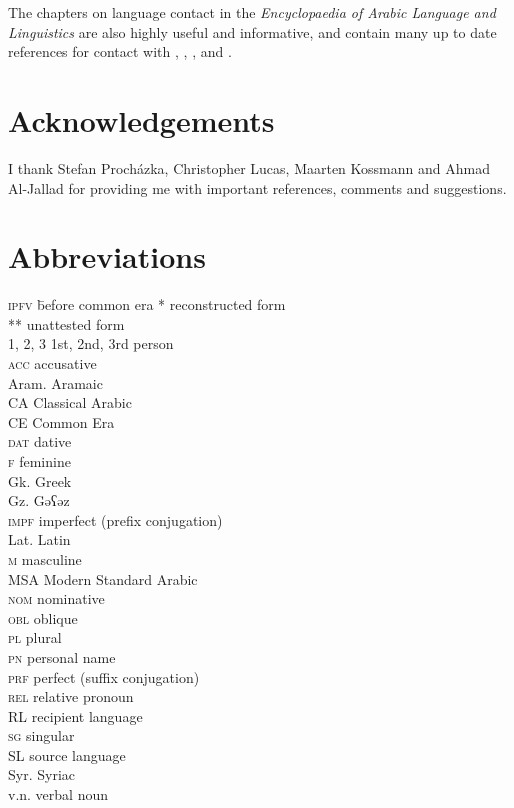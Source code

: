 \documentclass[output=paper]{langsci/langscibook}
\begin{document}
The chapters on language contact in the \textit{Encyclopaedia of Arabic Language and Linguistics} are also highly useful and informative, and contain many up to date references for contact with  \citep{Gutas2011},  \citep{Asbaghi2011},  \cite{Retsö2011}, and  \citep{Procházka2011Turkish}.

\section*{Acknowledgements}
I thank Stefan Procházka, Christopher Lucas, Maarten Kossmann and Ahmad Al-Jallad for providing me with important references, comments and suggestions.

\section*{Abbreviations}
\begin{multicols}{2}
\begin{tabbing}
\textsc{ipfv} \hspace{1em} \= before common era\kill
*             \>  reconstructed form\\
**            \>  unattested form\\
\textsc {1, 2, 3} \> 1st, 2nd, 3rd person \\
\textsc{acc}  \>  accusative\\
{Aram.}         \>  Aramaic\\
{CA}            \>  Classical {Arabic}\\
CE            \>  Common Era\\
\textsc{dat}  \>  dative\\
\textsc{f}    \>  feminine\\
Gk.          \>  Greek\\
Gz.           \>  Gəʕəz\\
\textsc{impf} \>  imperfect (prefix conjugation)\\
Lat.         \>  Latin\\
\textsc{m}    \>  masculine\\
{MSA}           \>  Modern Standard {Arabic}\\
\textsc{nom}  \>  nominative\\
\textsc{obl}  \>  oblique\\
\textsc{pl}   \>  plural\\
\textsc{pn}   \> personal name\\
\textsc{prf}  \>  perfect (suffix conjugation)\\
\textsc{rel}  \>  {relative} pronoun\\
{RL}          \>  {recipient language}\\
\textsc{sg}   \>  singular\\
{SL}          \>  {source language}\\
Syr.          \>  Syriac\\
v.n.         \>  verbal noun
\end{tabbing}
\end{multicols}


{\sloppy\printbibliography[heading=subbibliography,notkeyword=this]}
\end{document}
